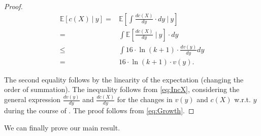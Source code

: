 \documentclass[11pt]{article}
\newcommand{\cF}{{\mathcal{F}}}
\newcommand{\E}{{\mathbb{E}}}
\begin{document}
{\begin{proof}
	\begin{equation}
		\label{eq:Growth}
		\begin{aligned}
		\E \left[ c(X) ~\bigg|~ y \right] ={} & 	\E \left[\int \frac{d c(X)}{d y} \cdot d y ~\bigg|~ y \right] \\
		={} &  \int \E \left[ \frac{d c(X)}{d y}  ~\bigg|~ y \right] \cdot d y \\
		\leq{} & \int 16 \cdot \ln (k+1) \cdot  \frac{d v(y)}{d y} d y \\
		={} & 16 \cdot \ln (k+1) \cdot v(y). 
		\end{aligned}
	\end{equation}
	
	The second equality follows by the linearity of the expectation (changing the order of summation). The inequality follows from \eqref{eq:IncX}, considering the general expression $\frac{d v(y)}{d y}$ and  $\frac{d c(X)}{d y}$ for the changes in $v(y)$ and $c(X)$ w.r.t. $y$ during the course of . The proof follows from \eqref{eq:Growth}. 
\end{proof}


We can finally prove our main result.

}
\end{document}
